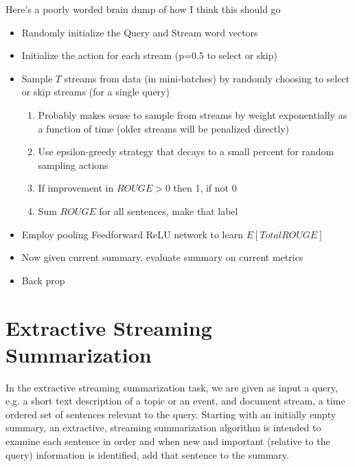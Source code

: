 \documentclass[12pt]{article}
\begin{document}
Here's a poorly worded brain dump of how I think this should go
\begin{itemize}
\item Randomly initialize the Query and Stream word vectors
\item Initialize the action for each stream (p=0.5 to select or skip)
\item Sample $T$ streams from data (in mini-batches) by randomly choosing to select or skip streams (for a single query)
	\begin{enumerate}
		\item Probably makes sense to sample from streams by weight exponentially as a function of time (older streams will be penalized directly)
		\item Use epsilon-greedy strategy that decays to a small percent for random sampling  actions
		\item If improvement in $ROUGE>0$ then 1, if not 0
		\item Sum $ROUGE$ for all sentences, make that label
	\end{enumerate}
\item Employ pooling Feedforward ReLU network to learn $E[Total ROUGE]$
\item Now given current summary, evaluate summary on current metrics
\item Back prop
\end{itemize}
\section{Extractive Streaming Summarization}

  In the extractive streaming summarization task, we are given as input
  a query, e.g. a short text description of a topic or an event, and 
  document stream, a time ordered set of sentences 
  relevant to the query. Starting with an initially empty summary,  
  an extractive, streaming summarization algorithm is intended to 
  examine each sentence in order and when new and important (relative to the 
  query) information is identified, add that sentence to the summary. 
\end{document}
